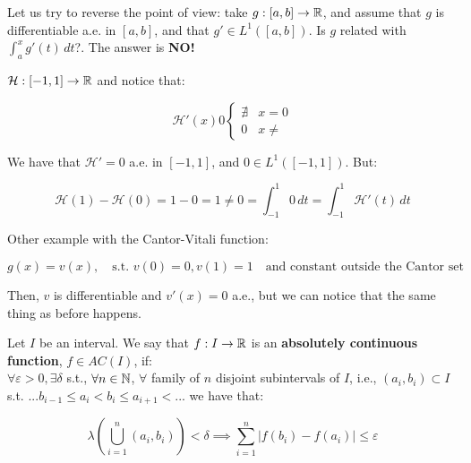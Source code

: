\begin{fremark}
    Let us try to reverse the point of view: take $g: [a, b] \to \mathbb{R}$, and assume that
    $g$ is differentiable a.e. in $[a, b]$, and that $g' \in L^1([a, b])$. Is 
    $g$ related with $\int_a^x g'(t) \, dt$?. The answer is \textbf{NO!}
\end{fremark}

\begin{fexample}
    $\mathcal{H}: [-1, 1] \to \mathbb{R}$ and notice that:

    $$\mathcal{H}'(x) 0 \begin{cases}
        \nexists & x = 0\\
        0 & x \neq
    \end{cases}$$

    We have that $\mathcal{H}' = 0$ a.e. in $[-1, 1]$, and $0 \in L^1([-1, 1])$.
    But:

    $$\mathcal{H}(1) - \mathcal{H}(0) = 1 - 0 = 1 \neq 0 = \int_{-1}^1 0 \, dt = \int_{-1}^1 \mathcal{H}'(t) \, dt$$

    Other example with the Cantor-Vitali function:

    $$g(x) = v(x), \quad \text{s.t. } v(0) = 0, v(1) = 1 \quad \text{and constant outside the Cantor set}$$

    Then, $v$ is differentiable and $v'(x) = 0$ a.e., but we can notice that the same thing
    as before happens.
\end{fexample}

\vspace{1em}

\begin{fdefinition}
    Let $I$ be an interval. We say that $f: I \to \mathbb{R}$ is an 
    \textbf{absolutely continuous function}, $f \in AC(I)$, if:\\

    $\forall \varepsilon > 0, \exists \delta$ s.t., $\forall n \in \mathbb{N}$, 
    $\forall$ family of $n$ disjoint subintervals of $I$, i.e., $(a_i, b_i) \subset I$ s.t.
    $... b_{i - 1} \leq a_i < b_i \leq a_{i+1} < ...$ we have that:

    $$\lambda \left( \bigcup_{i=1}^n (a_i, b_i) \right) < \delta \implies \sum_{i=1}^n |f(b_i) - f(a_i)| \leq \varepsilon$$  

\end{fdefinition}

